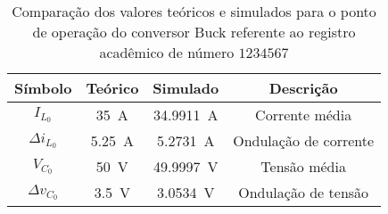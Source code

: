 \begin{table}[!ht]
\centering
\caption{Comparação dos valores teóricos e simulados para o ponto de operação do conversor Buck referente ao registro acadêmico de número $1234567$}
\label{tab:steadystatesim}
\begin{tabular}{@{}cccc@{}}
\toprule
\textbf{Símbolo} & \textbf{Teórico} & \textbf{Simulado} & \textbf{Descrição}\\ \midrule
$I_{L_0}$ & \SI{35}{\A} & \SI{34.9911}{\A} & Corrente média\\
$\Delta{i_{L_0}}$  & \SI{5.25}{\A} & \SI{5.2731}{\A}& Ondulação de corrente\\
$V_{C_0}$ & \SI{50}{\V} & \SI{49.9997}{\V} & Tensão média\\
$\Delta{v_{C_0}}$  & \SI{3.5}{\V} & \SI{3.0534}{\V}& Ondulação de tensão \\
\bottomrule
\end{tabular}
\end{table}

